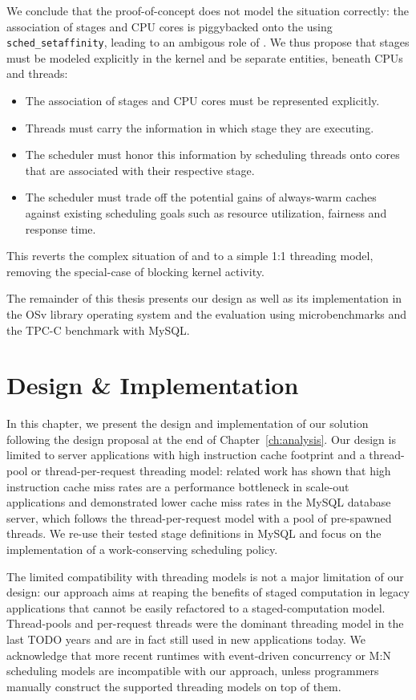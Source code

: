 \documentclass[12pt,a4paper]{book}
\begin{document}
We conclude that the proof-of-concept does not model the situation correctly: the association of stages and CPU cores is piggybacked onto the \klts using \texttt{sched\_setaffinity}, leading to an ambigous role of \klts.
We thus propose that stages must be modeled explicitly in the kernel and be separate entities, beneath CPUs and threads:
\begin{itemize}%
    \item The association of stages and CPU cores must be represented explicitly.
    \item Threads must carry the information in which stage they are executing.
    \item The scheduler must honor this information by scheduling threads onto cores that are associated with their respective stage.
    \item The scheduler must trade off the potential gains of always-warm caches against existing scheduling goals such as resource utilization, fairness and response time.
\end{itemize}%
This reverts the complex situation of \ults and \klts to a simple 1:1 threading model, removing the special-case of blocking kernel activity.

The remainder of this thesis presents our design as well as its implementation in the OSv library operating system and the evaluation using microbenchmarks and the TPC-C benchmark with MySQL.

\chapter{Design \& Implementation}\label{ch:di}
In this chapter, we present the design and implementation of our solution following the design proposal at the end of Chapter~\ref{ch:analysis}.
Our design is limited to server applications with high instruction cache footprint and a thread-pool or thread-per-request threading model:
related work has shown that high instruction cache miss rates are a performance bottleneck in scale-out applications
and demonstrated lower cache miss rates in the MySQL database server, which follows the thread-per-request model with a pool of pre-spawned threads.
We re-use their tested stage definitions in MySQL  and focus on the implementation of a work-conserving scheduling policy.
\cite{kanev2015profiling,mysqlThreading}

The limited compatibility with threading models is not a major limitation of our design:
our approach aims at reaping the benefits of staged computation in legacy applications that cannot be easily refactored to a staged-computation model.
Thread-pools and per-request threads were the dominant threading model in the last TODO years and are in fact still used in new applications today.
We acknowledge that more recent runtimes with event-driven concurrency or M:N scheduling models are incompatible with our approach, unless programmers manually construct the supported threading models on top of them.
\end{document}
